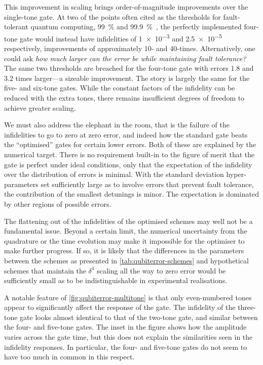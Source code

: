 This improvement in scaling brings order-of-magnitude improvements over the single-tone gate.
At two of the points often cited as the thresholds for fault-tolerant quantum computing, \qty{99}{\percent} and \qty{99.9}{\percent}~\cite{Knill2005}, the perfectly implemented four-tone gate would instead have infidelities of \num{1e-3} and \num{2.5e-5} respectively, improvements of approximately 10- and 40-times.
Alternatively, one could ask \emph{how much larger can the error be while maintaining fault tolerance?}
The same two thresholds are breached for the four-tone gate with errors $1.8$ and $3.2$ times larger---a sizeable improvement.
The story is largely the same for the five- and six-tone gates.
While the constant factors of the infidelity can be reduced with the extra tones, there remains insufficient degrees of freedom to achieve greater scaling.

We must also address the elephant in the room, that is the failure of the infidelities to go to zero at zero error, and indeed how the standard gate beats the ``optimised'' gates for certain lower errors.
Both of these are explained by the numerical target.
There is no requirement built-in to the figure of merit that the gate is perfect under ideal conditions, only that the expectation of the infidelity over the distribution of errors is minimal.
With the standard deviation hyper-parameters set sufficiently large as to involve errors that prevent fault tolerance, the contribution of the smallest detunings is minor.
The expectation is dominated by other regions of possible errors.

The flattening out of the infidelities of the optimised schemes may well not be a fundamental issue.
Beyond a certain limit, the numerical uncertainty from the quadrature or the time evolution may make it impossible for the optimiser to make further progress.
If so, it is likely that the differences in the parameters between the schemes as presented in \cref{tab:qubiterror-schemes} and hypothetical schemes that maintain the $\delta^4$ scaling all the way to zero error would be sufficiently small as to be indistinguishable in experimental realisations.

A notable feature of \cref{fig:qubiterror-multitone} is that only even-numbered tones appear to significantly affect the response of the gate.
The infidelity of the three-tone gate looks almost identical to that of the two-tone gate, and similar between the four- and five-tone gates.
The inset in the figure shows how the amplitude varies across the gate time, but this does not explain the similarities seen in the infidelity responses.
In particular, the four- and five-tone gates do not seem to have too much in common in this respect.

